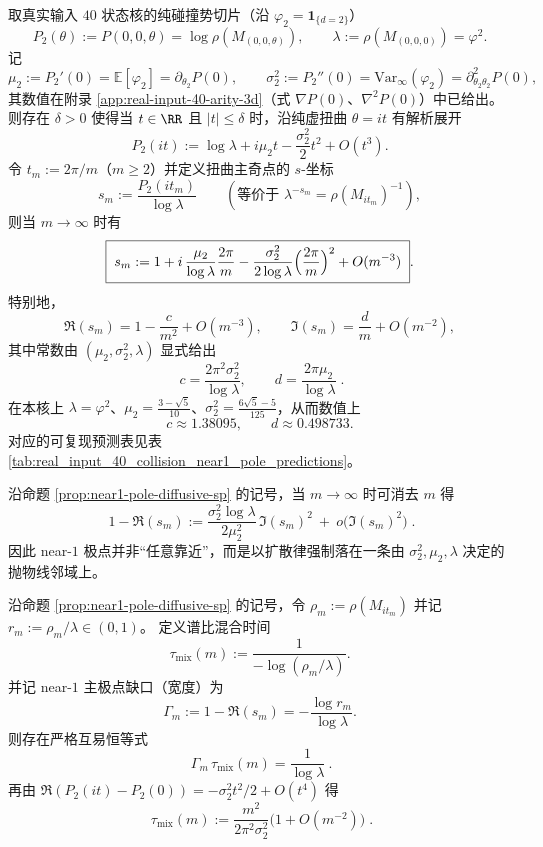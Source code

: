 \begin{proposition}\label{prop:near1-pole-diffusive-sp}
取真实输入 \(40\) 状态核的纯碰撞势切片（沿 \(\varphi_2=\mathbf{1}_{\{d=2\}}\)）
\[
P_2(\theta):=P(0,0,\theta)=\log\rho(M_{(0,0,\theta)}),
\qquad \lambda:=\rho(M_{(0,0,0)})=\varphi^2.
\]
记
\[
\mu_2:=P_2'(0)=\mathbb{E}[\varphi_2]=\partial_{\theta_2}P(0),
\qquad
\sigma_2^2:=P_2''(0)=\mathrm{Var}_\infty(\varphi_2)=\partial_{\theta_2\theta_2}^2P(0),
\]
其数值在附录 \ref{app:real-input-40-arity-3d}（式 \(\nabla P(0)\)、\(\nabla^2P(0)\)）中已给出。
则存在 \(\delta>0\) 使得当 \(t\in\RR\) 且 \(|t|\le \delta\) 时，沿纯虚扭曲 \(\theta=it\) 有解析展开
\[
P_2(it)
:=\log\lambda+i\mu_2 t-\frac{\sigma_2^2}{2}t^2+O(t^3).
\]
令 \(t_m:=2\pi/m\)（\(m\ge 2\)）并定义扭曲主奇点的 \(s\)-坐标
\[
s_m:=\frac{P_2(it_m)}{\log\lambda}
\qquad(\text{等价于 } \lambda^{-s_m}=\rho(M_{it_m})^{-1}),
\]
则当 \(m\to\infty\) 时有
\[
\boxed{\;
s_m
:=1+i\,\frac{\mu_2}{\log\lambda}\frac{2\pi}{m}
-\frac{\sigma_2^2}{2\log\lambda}\Bigl(\frac{2\pi}{m}\Bigr)^2
+O(m^{-3})\; }.
\]
特别地，
\[
\Re(s_m)=1-\frac{c}{m^2}+O(m^{-3}),
\qquad
\Im(s_m)=\frac{d}{m}+O(m^{-2}),
\]
其中常数由 \((\mu_2,\sigma_2^2,\lambda)\) 显式给出
\[
\boxed{\;
c=\frac{2\pi^2\sigma_2^2}{\log\lambda},
\qquad
d=\frac{2\pi\mu_2}{\log\lambda}\; }.
\]
在本核上 \(\lambda=\varphi^2\)、\(\mu_2=\frac{3-\sqrt5}{10}\)、\(\sigma_2^2=\frac{6\sqrt5-5}{125}\)，从而数值上
\[
c\approx 1.38095,
\qquad
d\approx 0.498733.
\]
对应的可复现预测表见表 \ref{tab:real_input_40_collision_near1_pole_predictions}。
\end{proposition}

\begin{corollary}\label{cor:near1-pole-parabola}
沿命题 \ref{prop:near1-pole-diffusive-sp} 的记号，当 \(m\to\infty\) 时可消去 \(m\) 得
\[
\boxed{\;
1-\Re(s_m)
:=\frac{\sigma_2^2\log\lambda}{2\mu_2^2}\,\Im(s_m)^2\ +\ o\!\bigl(\Im(s_m)^2\bigr)\; }.
\]
因此 near-\(1\) 极点并非“任意靠近”，而是以扩散律强制落在一条由
\(\sigma_2^2,\mu_2,\lambda\) 决定的抛物线邻域上。
\end{corollary}

\begin{corollary}\label{cor:near1-pole-taumix-m2}
沿命题 \ref{prop:near1-pole-diffusive-sp} 的记号，令 \(\rho_m:=\rho(M_{it_m})\) 并记 \(r_m:=\rho_m/\lambda\in(0,1)\)。
定义谱比混合时间
\[
\tau_{\mathrm{mix}}(m):=\frac{1}{-\log(\rho_m/\lambda)}.
\]
并记 near-\(1\) 主极点缺口（宽度）为
\[
\Gamma_m:=1-\Re(s_m)=-\frac{\log r_m}{\log\lambda}.
\]
则存在严格互易恒等式
\[
\boxed{\ \Gamma_m\,\tau_{\mathrm{mix}}(m)=\frac{1}{\log\lambda}\ }.
\]
再由 \(\Re(P_2(it)-P_2(0))=-\sigma_2^2 t^2/2+O(t^4)\) 得
\[
\boxed{\;
\tau_{\mathrm{mix}}(m)
:=\frac{m^2}{2\pi^2\sigma_2^2}\bigl(1+O(m^{-2})\bigr)\; }.
\]
\end{corollary}

